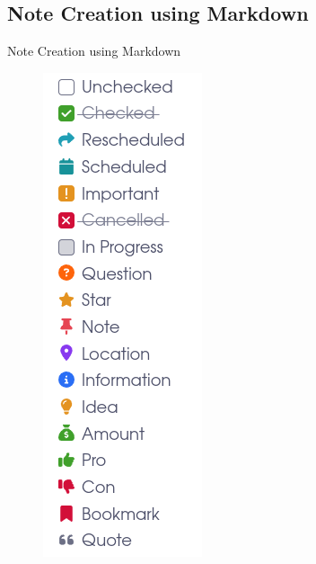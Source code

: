 \documentclass[10pt, xcolor=dvipsnames]{beamer}
\begin{document}
	\subsection{Note Creation using Markdown}
	\begin{frame}{Note Creation using Markdown}
	\begin{figure}
		\centering
		\begin{minipage}{.32\textwidth}
			\centering
			\includegraphics[width=.7\linewidth]{../latex-image/markdown1}

\end{minipage}
\end{figure}
\end{frame}
\end{document}
